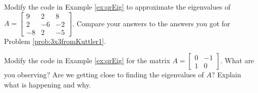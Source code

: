 \documentclass{ximera}
\begin{document}
\begin{problem}\label{prob_oct_qr1}
Modify the code in Example \ref{ex:qrEig} to approximate the eigenvalues of $A=\begin{bmatrix} 9 & 2 & 8\\ 2 & -6 & -2\\ -8 & 2 & -5\end{bmatrix}$.  Compare your answers to the answers you got for Problem \ref{prob:3x3fromKuttler1}. 
\end{problem}

\begin{problem}\label{prob_oct_qr2}
  Modify the code in Example \ref{ex:qrEig} for the matrix $A=\begin{bmatrix} 0 & -1\\ 1 & 0 \end{bmatrix}$.  What are you observing?  Are we getting close to finding the eigenvalues of $A$?  Explain what is happening and why.
  \end{problem}
\end{document}

